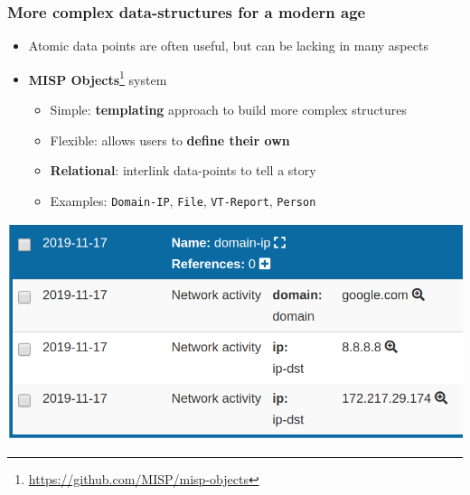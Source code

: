 \begin{frame}
    \frametitle{More complex data-structures for a modern age}
    \begin{itemize}
        \item Atomic data points are often useful, but can be lacking in many aspects
        \item {\bf MISP Objects}\footnote{\url{https://github.com/MISP/misp-objects}} system
        \begin{itemize}
            \item Simple: {\bf templating} approach to build more complex structures
            \item Flexible: allows users to {\bf define their own}
            \item {\bf Relational}: interlink data-points to tell a story
            \item Examples: \texttt{Domain-IP}, \texttt{File}, \texttt{VT-Report}, \texttt{Person}
        \end{itemize}
    \end{itemize}
    \begin{center}
        \includegraphics[scale=0.25]{pics/domain-ip}
    \end{center}
\end{frame}

